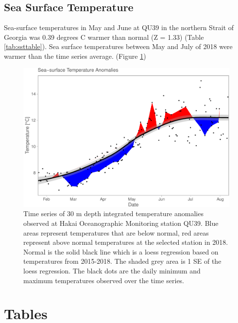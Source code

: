 \documentclass[fleqn,10pt]{wlpeerj} %
\begin{document}
\subsection*{Sea Surface Temperature}\label{sea-surface-temperature}

Sea-surface temperatures in May and June at QU39 in the northern Strait
of Georgia was 0.39 degrees C warmer than normal (Z = 1.33) (Table
\ref{tab:ssttable}). Sea surface temperatures between May and July of
2018 were warmer than the time series average. (Figure \ref{fig:sst})

\begin{figure}[H]
\includegraphics[width=0.9\linewidth]{peer_j_migration_dynamics_files/figure-latex/sst-1} \caption{Time series of 30 m depth integrated temperature anomalies observed at Hakai Oceanographic Monitoring station QU39. Blue areas represent temperatures that are below normal, red areas represent above normal temperatures at the selected station in 2018. Normal is the solid black line which is a loess regression based on temperatures from 2015-2018. The shaded grey area is 1 SE of the loess regression. The black dots are the daily minimum and maximum temperatures observed over the time series.}\label{fig:sst}
\end{figure}

\section*{Tables}\label{tables}
\end{document}
